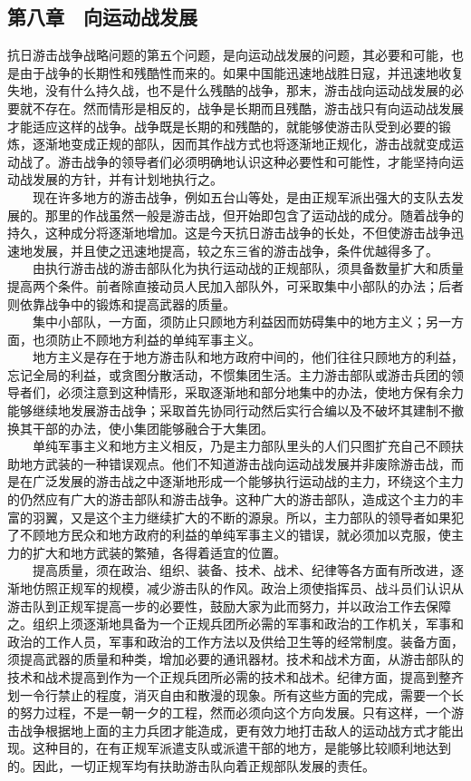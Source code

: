 \documentclass[cn,11pt,chinese]{elegantbook}
\def\myformat#1{\hfil\hfil #1}
\begin{document}
\subsection*{\myformat{第八章　向运动战发展}}
抗日游击战争战略问题的第五个问题，是向运动战发展的问题，其必要和可能，也是由于战争的长期性和残酷性而来的。如果中国能迅速地战胜日寇，并迅速地收复失地，没有什么持久战，也不是什么残酷的战争，那末，游击战向运动战发展的必要就不存在。然而情形是相反的，战争是长期而且残酷，游击战只有向运动战发展才能适应这样的战争。战争既是长期的和残酷的，就能够使游击队受到必要的锻炼，逐渐地变成正规的部队，因而其作战方式也将逐渐地正规化，游击战就变成运动战了。游击战争的领导者们必须明确地认识这种必要性和可能性，才能坚持向运动战发展的方针，并有计划地执行之。\\
　　现在许多地方的游击战争，例如五台山等处，是由正规军派出强大的支队去发展的。那里的作战虽然一般是游击战，但开始即包含了运动战的成分。随着战争的持久，这种成分将逐渐地增加。这是今天抗日游击战争的长处，不但使游击战争迅速地发展，并且使之迅速地提高，较之东三省的游击战争，条件优越得多了。\\
　　由执行游击战的游击部队化为执行运动战的正规部队，须具备数量扩大和质量提高两个条件。前者除直接动员人民加入部队外，可采取集中小部队的办法；后者则依靠战争中的锻炼和提高武器的质量。\\
　　集中小部队，一方面，须防止只顾地方利益因而妨碍集中的地方主义；另一方面，也须防止不顾地方利益的单纯军事主义。\\
　　地方主义是存在于地方游击队和地方政府中间的，他们往往只顾地方的利益，忘记全局的利益，或贪图分散活动，不惯集团生活。主力游击部队或游击兵团的领导者们，必须注意到这种情形，采取逐渐地和部分地集中的办法，使地方保有余力能够继续地发展游击战争；采取首先协同行动然后实行合编以及不破坏其建制不撤换其干部的办法，使小集团能够融合于大集团。\\
　　单纯军事主义和地方主义相反，乃是主力部队里头的人们只图扩充自己不顾扶助地方武装的一种错误观点。他们不知道游击战向运动战发展并非废除游击战，而是在广泛发展的游击战之中逐渐地形成一个能够执行运动战的主力，环绕这个主力的仍然应有广大的游击部队和游击战争。这种广大的游击部队，造成这个主力的丰富的羽翼，又是这个主力继续扩大的不断的源泉。所以，主力部队的领导者如果犯了不顾地方民众和地方政府的利益的单纯军事主义的错误，就必须加以克服，使主力的扩大和地方武装的繁殖，各得着适宜的位置。\\
　　提高质量，须在政治、组织、装备、技术、战术、纪律等各方面有所改进，逐渐地仿照正规军的规模，减少游击队的作风。政治上须使指挥员、战斗员们认识从游击队到正规军提高一步的必要性，鼓励大家为此而努力，并以政治工作去保障之。组织上须逐渐地具备为一个正规兵团所必需的军事和政治的工作机关，军事和政治的工作人员，军事和政治的工作方法以及供给卫生等的经常制度。装备方面，须提高武器的质量和种类，增加必要的通讯器材。技术和战术方面，从游击部队的技术和战术提高到作为一个正规兵团所必需的技术和战术。纪律方面，提高到整齐划一令行禁止的程度，消灭自由和散漫的现象。所有这些方面的完成，需要一个长的努力过程，不是一朝一夕的工程，然而必须向这个方向发展。只有这样，一个游击战争根据地上面的主力兵团才能造成，更有效力地打击敌人的运动战方式才能出现。这种目的，在有正规军派遣支队或派遣干部的地方，是能够比较顺利地达到的。因此，一切正规军均有扶助游击队向着正规部队发展的责任。\\
\end{document}
